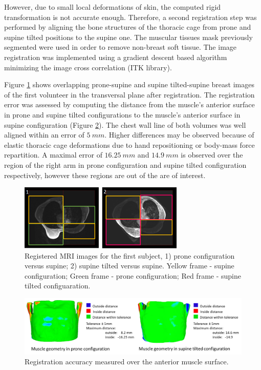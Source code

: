 However, due to small local deformations of skin, the computed rigid transformation is not accurate enough. Therefore, a second registration step was performed by aligning the bone structures of the thoracic cage from prone and supine tilted positions to the supine one. The muscular tissues mask previously segmented were used in order to remove non-breast soft tissue. The image registration was implemented using a gradient descent based algorithm minimizing the image cross correlation (ITK library).

Figure \ref{fig:patientdataregistered} shows overlapping  prone-supine and supine tilted-supine breast images of the first volunteer in the transversal plane after registration. The registration error was assessed by computing the distance from the muscle's anterior surface in prone and supine tilted configurations to the muscle's anterior surface in supine configuration (Figure \ref{fig:volume_registration_error}). The chest wall line of both volumes was well aligned within an error of $ 5 \ mm$. Higher differences may be observed because of elastic thoracic cage deformations due to hand repositioning or body-mass force repartition. A maximal error of $16.25 \ mm$  and $14.9\ mm$ is observed over the region of the right arm in prone configuration and supine tilted configuration respectively, however these regions are out of the are of interest.  

\begin{figure}[!h]
\centering
\includegraphics[width=0.7\textwidth,keepaspectratio]{figures/patientDataRegisteredSubject1.png} 
\caption{Registered MRI images for the first subject, 1) prone configuration versus supine; 2) supine tilted versus supine. Yellow frame - supine configuration; Green frame - prone configuration; Red frame - supine tilted configuaration.}\label{fig:patientdataregistered}
\end{figure}

\begin{figure}[!h]
\centering
\includegraphics[width=1\textwidth,keepaspectratio]{figures/volume_registration_error.png} 
\caption{Registration accuracy measured over the anterior muscle surface.}\label{fig:volume_registration_error}
\end{figure}

